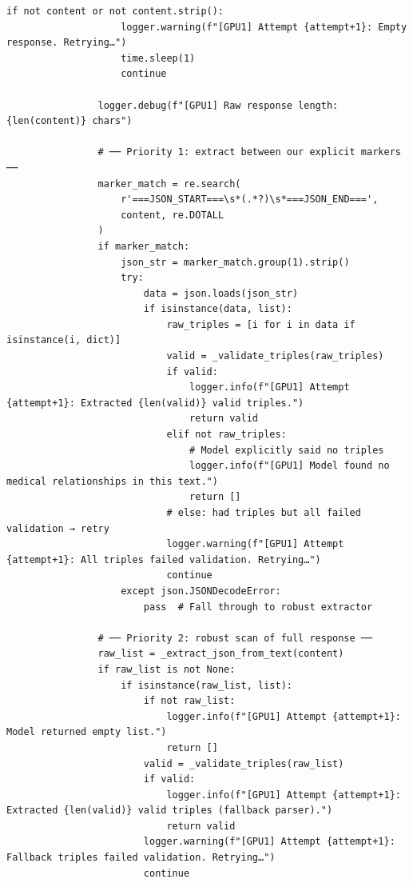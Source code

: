 \documentclass[11pt]{article}
\begin{document}
\begin{lstlisting}[style=pythoncode, caption={kg\_generator\_gpu\_1.py}]
                if not content or not content.strip():
                    logger.warning(f"[GPU1] Attempt {attempt+1}: Empty response. Retrying…")
                    time.sleep(1)
                    continue

                logger.debug(f"[GPU1] Raw response length: {len(content)} chars")

                # ── Priority 1: extract between our explicit markers ──
                marker_match = re.search(
                    r'===JSON_START===\s*(.*?)\s*===JSON_END===',
                    content, re.DOTALL
                )
                if marker_match:
                    json_str = marker_match.group(1).strip()
                    try:
                        data = json.loads(json_str)
                        if isinstance(data, list):
                            raw_triples = [i for i in data if isinstance(i, dict)]
                            valid = _validate_triples(raw_triples)
                            if valid:
                                logger.info(f"[GPU1] Attempt {attempt+1}: Extracted {len(valid)} valid triples.")
                                return valid
                            elif not raw_triples:
                                # Model explicitly said no triples
                                logger.info(f"[GPU1] Model found no medical relationships in this text.")
                                return []
                            # else: had triples but all failed validation → retry
                            logger.warning(f"[GPU1] Attempt {attempt+1}: All triples failed validation. Retrying…")
                            continue
                    except json.JSONDecodeError:
                        pass  # Fall through to robust extractor

                # ── Priority 2: robust scan of full response ──
                raw_list = _extract_json_from_text(content)
                if raw_list is not None:
                    if isinstance(raw_list, list):
                        if not raw_list:
                            logger.info(f"[GPU1] Attempt {attempt+1}: Model returned empty list.")
                            return []
                        valid = _validate_triples(raw_list)
                        if valid:
                            logger.info(f"[GPU1] Attempt {attempt+1}: Extracted {len(valid)} valid triples (fallback parser).")
                            return valid
                        logger.warning(f"[GPU1] Attempt {attempt+1}: Fallback triples failed validation. Retrying…")
                        continue


\end{lstlisting}
\end{document}
